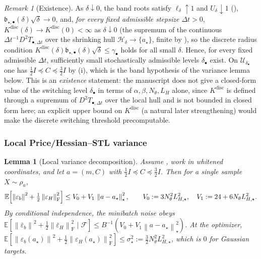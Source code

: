 \documentclass[11pt]{article}
\theoremstyle{plain}
\newtheorem{lemma}[lemma]{Lemma}
\theoremstyle{definition}
\theoremstyle{remark}
\newtheorem{remark}[remark]{Remark}
\newcommand{\E}{\mathbb{E}}
\newcommand{\Id}{I}
\newcommand{\Frob}{\mathrm{F}}
\newcommand{\Fil}{\mathcal{F}}
\newcommand{\norm}[1]{\left\lVert #1\right\rVert}
\newcommand{\LH}{L_H}
\newcommand{\Ureg}{\mathcal{U}}
\newcommand{\Hreg}{\mathcal{H}}
\newcommand{\Kdisc}{K^{\mathrm{disc}}}
\newcommand{\LHs}{L_{H,\star}}
\begin{document}
\begin{remark}[Existence]
\label{rem:stoch-admissible-exists}
As $\delta\downarrow0$, the band roots satisfy $\ell_\delta\uparrow1$ and $U_\delta\downarrow1$
(), $\mathfrak b_{\star,\bullet}(\delta)\sqrt\delta\to0$, and, \emph{for every fixed
admissible stepsize $\Delta t>0$}, $\Kdisc(\delta)\to\Kdisc(0)<\infty$ as $\delta\downarrow0$ (the
supremum of the continuous $\Delta t^{-1}D^2T_{\bullet,\Delta t}$ over the shrinking hull
$\Hreg_\delta\to\{a_\star\}$, finite by ), so the discrete radius condition
$\Kdisc(\delta)\mathfrak b_{\star,\bullet}(\delta)\sqrt\delta\leq\gamma_\bullet$ holds for all small
$\delta$. Hence, for every fixed admissible $\Delta t$, sufficiently small stochastically admissible
levels $\delta_\bullet$ exist. On $\Ureg_{\delta_\bullet}$ one has
$\tfrac12\Id\preceq C\preceq\tfrac32\Id$ by (i), which is the band hypothesis of the
variance lemma below. This is an \emph{existence} statement: the manuscript does not give a
closed-form value of the switching level $\delta_\bullet$ in terms of $\alpha,\beta,N_\theta,\LH$
alone, since $\Kdisc$ is defined through a supremum of $D^2T_{\bullet,\Delta t}$ over the local hull
and is not bounded in closed form here; an explicit upper bound on $\Kdisc$ (a natural later
strengthening) would make the discrete switching threshold precomputable.
\end{remark}

\subsubsection{Local Price/Hessian--STL variance}
\label{subsec:local-var}

\begin{lemma}[Local variance decomposition]
\label{lem:local-variance}
Assume , work in whitened coordinates, and let
$a=(m,C)$ with $\tfrac12\Id\preceq C\preceq\tfrac32\Id$. Then for a single sample $X\sim\rho_a$,
\begin{equation}
\label{eq:local-var}
    \E\Bigl[\norm{\varepsilon_b}^2+\tfrac12\norm{\varepsilon_H}_{\Frob}^2\Bigr]
    \leq V_0+V_1\,\norm{a-a_\star}_\star^2,
    \qquad
    V_0:=3N_\theta^2\LHs^2,\quad V_1:=24+6N_\theta\LHs^2 .
\end{equation}
By conditional independence, the minibatch noise obeys
$\E[\norm{\overline\varepsilon_b}^2+\tfrac12\norm{\overline\varepsilon_H}_{\Frob}^2\mid\Fil]\leq B^{-1}(V_0+V_1\norm{a-a_\star}_\star^2)$.
At the optimizer, $\E[\norm{\varepsilon_b(a_\star)}^2+\tfrac12\norm{\varepsilon_H(a_\star)}_{\Frob}^2]\leq\sigma_\star^2:=\tfrac32N_\theta^2\LHs^2$,
which is $0$ for Gaussian targets.
\end{lemma}
\end{document}
